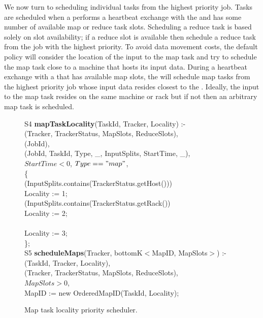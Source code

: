We now turn to scheduling individual tasks from the highest priority job. Tasks are scheduled when
a \TT performs a heartbeat exchange with the \JT and has some number of available map or reduce 
task slots. Scheduling a reduce task is based solely on slot availability; if a reduce slot is available then
schedule a reduce task from the job with the highest priority. To avoid data movement costs, the default policy
will consider the location of the input to the map task and try to schedule the map task close to a machine 
that hosts its input data. During a heartbeat exchange with a \TT that has available map slots, the \JT will schedule 
map tasks from the highest priority job whose input data resides closest to the \TT. Ideally, the input to the map task resides 
on the same machine or rack but if not then an arbitrary map task is scheduled. 

\begin{figure}
\ssp
\centering
\begin{boxedminipage}{\linewidth}
S4 {\bf mapTaskLocality}(TaskId, Tracker, Locality) :- \\
(Tracker, TrackerStatus, MapSlots, ReduceSlots), \\
(JobId), \\
(JobId, TaskId, Type, \_, InputSplits, StartTime, \_), \\
\datalogspace $StartTime < 0$, $Type == "map"$, \\
\datalogspace \{ \\
\datalogspace {} (InputSplits.contains(TrackerStatus.getHost())) \\
\datalogspace \datalogspace \datalogspace Locality := 1; \\
\datalogspace {} (InputSplits.contains(TrackerStatus.getRack()) \\
\datalogspace \datalogspace \datalogspace Locality := 2; \\
\datalogspace {} \\
\datalogspace \datalogspace \datalogspace Locality := 3; \\
\datalogspace \}; \\
	
S5 {\bf scheduleMaps}(Tracker, bottomK$<$MapID, MapSlots$>$) :- \\
(TaskId, Tracker, Locality), \\
(Tracker, TrackerStatus, MapSlots, ReduceSlots), \\
\datalogspace $MapSlots > 0$, \\
\datalogspace MapID := new OrderedMapID(TaskId, Locality); \\

\end{boxedminipage}
\caption{\label{fig:schedulemaps} Map task locality priority scheduler.}
\end{figure}

